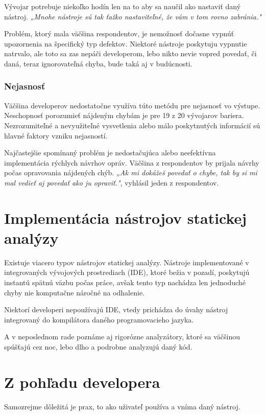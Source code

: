 \documentclass[10pt,twoside,slovak,a4paper]{article}
\begin{document}
Vývojar potrebuje niekoľko hodín len na to aby sa naučil ako nastaviť daný nástroj. \emph{„Mnohe nástroje sú tak ťažko nastaviteľné, že vám v tom rovno zabránia."}

Problém, ktorý mala väčšina respondentov, je nemožnosť dočasne vypnúť upozornenia na špecifický typ defektov. Niektoré
nástroje poskytuju vypnutie natrvalo, ale toto sa zas nepáči developerom, lebo nikto nevie vopred povedať, či daná,
teraz ignorovateľná chyba, bude taká aj v budúcnosti.

\subsubsection*{Nejasnosť}
Väčšina developerov nedostatočne využíva túto metódu pre nejasnosť vo výstupe. Neschopnosť porozumieť nájdeným chybám
je pre 19 z 20 vývojarov bariera. Nezrozumiteľné a nevyužiteľné vysvetlenia alebo málo poskytnutých informácií sú hlavné
faktory vzniku nejasností.

Najčastejšie spomínaný problém je nedostačujúca alebo neefektívna implementácia rýchlych návrhov opráv. Väčšina z
respondentov by prijala návrhy počas opravovania nájdených chýb. \emph{„Ak mi dokážeš povedať o chybe, tak by si mi mal
	vedieť aj povedať ako ju opraviť."}, vyhlásil jeden z respondentov.

\section{Implementácia nástrojov statickej analýzy} \label{implementacia}
Existuje viacero typov nástrojov statickej analýzy. Nástroje implementované v integrovaných vývojových prostrediach (IDE),
ktoré bežia v pozadí, poskytujú instantú spätnú väzbu počas práce, avšak tento typ nachádza len jednoduché chyby nie
komputačne náročné na odhalenie.

Niektorí developeri nepoužívajú IDE, vtedy prichádza do úvahy nástroj integrovaný do
kompilátora daného programovacieho jazyka.

A v neposlednom rade poznáme aj rigorózne analyzátory, ktoré sa väčšinou
spúšťajú cez noc, lebo dlho a podrobne analyzujú daný kód.\cite{BrittanyJohnson, LisaNguyen}

\section{Z pohľadu developera} \label{dev}
Samozrejme dôležitá je prax, to ako uživateľ používa a vníma daný nástroj\cite{LisaNguyen}.
\end{document}
